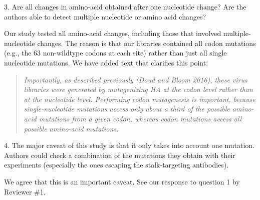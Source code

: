 \documentclass[11pt, oneside]{article}   	%
\begin{document}
3. Are all changes in amino-acid obtained after one nucleotide change? Are the authors able to detect multiple nucleotide or amino acid changes?

{\color{black}
Our study tested all amino-acid changes, including those that involved multiple-nucleotide changes.
The reason is that our libraries contained all codon mutations (e.g., the 63 non-wildtype codons at each site) rather than just all single nucleotide mutations.
We have added text that clarifies this point:
\begin{quote}
\textsl{Importantly, as described previously (Doud and Bloom 2016), these virus libraries were generated by mutagenizing HA at the \emph{codon} level rather than at the nucleotide level.
Performing codon mutagenesis is important, because single-nucleotide mutations access only about a third of the possible amino-acid mutations from a given codon, whereas codon mutations access all possible amino-acid mutations.}
\end{quote}
}

4. The major caveat of this study is that it only takes into account one mutation. Authors could check a combination of the mutations they obtain with their experiments (especially the ones escaping the stalk-targeting antibodies).

{\color{black}
We agree that this is an important caveat.
See our response to question 1 by Reviewer \#1.}
\end{document}
